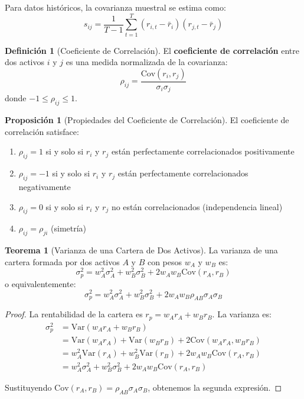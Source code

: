 \documentclass[12pt,a4paper]{article}
\theoremstyle{definition}
\newtheorem{definicion}{Definición}[section]
\newtheorem{teorema}{Teorema}[section]
\newtheorem{proposicion}{Proposición}[section]
\newcommand{\Var}{\text{Var}}
\newcommand{\Cov}{\text{Cov}}
\begin{document}
Para datos históricos, la covarianza muestral se estima como:
\begin{equation}
s_{ij} = \frac{1}{T-1} \sum_{t=1}^{T} (r_{i,t} - \bar{r}_i)(r_{j,t} - \bar{r}_j)
\end{equation}

\begin{definicion}[Coeficiente de Correlación]
El \textbf{coeficiente de correlación} entre dos activos $i$ y $j$ es una medida normalizada de la covarianza:
\begin{equation}
\rho_{ij} = \frac{\Cov(r_i, r_j)}{\sigma_i \sigma_j}
\end{equation}
donde $-1 \leq \rho_{ij} \leq 1$.
\end{definicion}

\begin{proposicion}[Propiedades del Coeficiente de Correlación]
El coeficiente de correlación satisface:
\begin{enumerate}
\item $\rho_{ij} = 1$ si y solo si $r_i$ y $r_j$ están perfectamente correlacionados positivamente
\item $\rho_{ij} = -1$ si y solo si $r_i$ y $r_j$ están perfectamente correlacionados negativamente
\item $\rho_{ij} = 0$ si y solo si $r_i$ y $r_j$ no están correlacionados (independencia lineal)
\item $\rho_{ij} = \rho_{ji}$ (simetría)
\end{enumerate}
\end{proposicion}

\begin{teorema}[Varianza de una Cartera de Dos Activos]
La varianza de una cartera formada por dos activos $A$ y $B$ con pesos $w_A$ y $w_B$ es:
\begin{equation}
\sigma_p^2 = w_A^2 \sigma_A^2 + w_B^2 \sigma_B^2 + 2 w_A w_B \Cov(r_A, r_B)
\end{equation}
o equivalentemente:
\begin{equation}
\sigma_p^2 = w_A^2 \sigma_A^2 + w_B^2 \sigma_B^2 + 2 w_A w_B \rho_{AB} \sigma_A \sigma_B
\end{equation}
\end{teorema}

\begin{proof}
La rentabilidad de la cartera es $r_p = w_A r_A + w_B r_B$. La varianza es:
\begin{align*}
\sigma_p^2 &= \Var(w_A r_A + w_B r_B) \\
&= \Var(w_A r_A) + \Var(w_B r_B) + 2\Cov(w_A r_A, w_B r_B) \\
&= w_A^2 \Var(r_A) + w_B^2 \Var(r_B) + 2 w_A w_B \Cov(r_A, r_B) \\
&= w_A^2 \sigma_A^2 + w_B^2 \sigma_B^2 + 2 w_A w_B \Cov(r_A, r_B)
\end{align*}

Sustituyendo $\Cov(r_A, r_B) = \rho_{AB} \sigma_A \sigma_B$, obtenemos la segunda expresión.
\end{proof}
\end{document}

